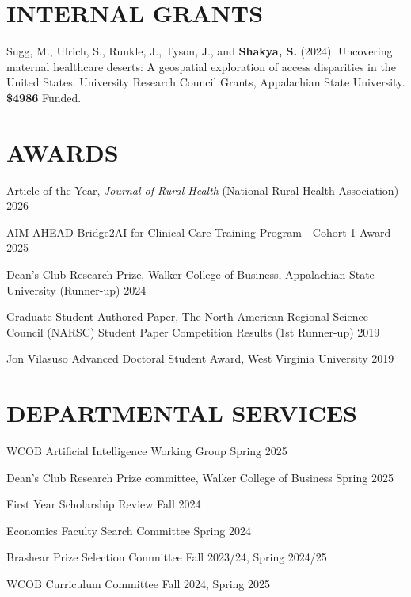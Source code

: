 \section*{INTERNAL GRANTS}
\begin{etaremune}
\item Sugg, M., Ulrich, S., Runkle, J., Tyson, J., and \textbf{Shakya, S.} (2024). Uncovering maternal healthcare deserts: A geospatial exploration of access disparities in the United States. University Research Council Grants, Appalachian State University. \textbf{\$4986} Funded.
\end{etaremune}

\section*{AWARDS}
\begin{list1}
\item[] Article of the Year, \textit{Journal of Rural Health} (National Rural Health Association) \hfill 2026
\item[] AIM-AHEAD Bridge2AI for Clinical Care Training Program - Cohort 1 Award \hfill 2025
\item[] Dean's Club Research Prize, Walker College of Business, Appalachian State University (Runner-up) \hfill 2024
\item[] Graduate Student-Authored Paper, The North American Regional Science Council (NARSC) Student Paper Competition Results  (1st Runner-up) \hfill 2019
\item[] Jon Vilasuso Advanced Doctoral Student Award, West Virginia University \hfill 2019
\end{list1}

\section*{DEPARTMENTAL SERVICES}
\begin{list1}
\item[] WCOB Artificial Intelligence Working Group \hfill Spring 2025
\item[] Dean's Club Research Prize committee, Walker College of Business \hfill Spring 2025
\item[] First Year Scholarship Review \hfill Fall 2024
\item[] Economics Faculty Search Committee \hfill Spring 2024 
\item[] Brashear Prize Selection Committee \hfill Fall 2023/24, Spring 2024/25
\item[] WCOB Curriculum Committee \hfill Fall 2024, Spring 2025
\end{list1}

